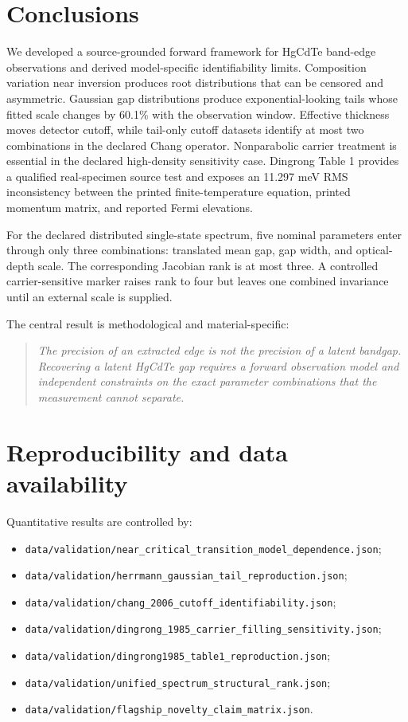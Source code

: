 \documentclass[12pt]{article}
\begin{document}
\section{Conclusions}

We developed a source-grounded forward framework for HgCdTe band-edge observations and derived model-specific identifiability limits. Composition variation near inversion produces root distributions that can be censored and asymmetric. Gaussian gap distributions produce exponential-looking tails whose fitted scale changes by 60.1\% with the observation window. Effective thickness moves detector cutoff, while tail-only cutoff datasets identify at most two combinations in the declared Chang operator. Nonparabolic carrier treatment is essential in the declared high-density sensitivity case. Dingrong Table 1 provides a qualified real-specimen source test and exposes an 11.297 meV RMS inconsistency between the printed finite-temperature equation, printed momentum matrix, and reported Fermi elevations.

For the declared distributed single-state spectrum, five nominal parameters enter through only three combinations: translated mean gap, gap width, and optical-depth scale. The corresponding Jacobian rank is at most three. A controlled carrier-sensitive marker raises rank to four but leaves one combined invariance until an external scale is supplied.

The central result is methodological and material-specific:

\begin{quote}\itshape
The precision of an extracted edge is not the precision of a latent bandgap. Recovering a latent HgCdTe gap requires a forward observation model and independent constraints on the exact parameter combinations that the measurement cannot separate.
\end{quote}

\section{Reproducibility and data availability}

Quantitative results are controlled by:

\begin{itemize}
\item \texttt{data/validation/near\_critical\_transition\_model\_dependence.json};
\item \texttt{data/validation/herrmann\_gaussian\_tail\_reproduction.json};
\item \texttt{data/validation/chang\_2006\_cutoff\_identifiability.json};
\item \texttt{data/validation/dingrong\_1985\_carrier\_filling\_sensitivity.json};
\item \texttt{data/validation/dingrong1985\_table1\_reproduction.json};
\item \texttt{data/validation/unified\_spectrum\_structural\_rank.json};
\item \texttt{data/validation/flagship\_novelty\_claim\_matrix.json}.
\end{itemize}
\end{document}
